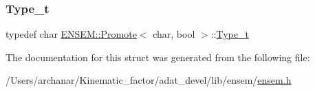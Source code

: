 \subsubsection{\texorpdfstring{Type\_t}{Type\_t}\hspace{0.1cm}{\footnotesize\ttfamily [2/2]}}
{\footnotesize\ttfamily typedef char \mbox{\hyperlink{structENSEM_1_1Promote}{E\+N\+S\+E\+M\+::\+Promote}}$<$ char, bool $>$\+::\mbox{\hyperlink{structENSEM_1_1Promote_3_01char_00_01bool_01_4_ad5b22f8f15e29245a56d9411fafedb3b}{Type\+\_\+t}}}



The documentation for this struct was generated from the following file\+:\begin{DoxyCompactItemize}
\item 
/\+Users/archanar/\+Kinematic\+\_\+factor/adat\+\_\+devel/lib/ensem/\mbox{\hyperlink{lib_2ensem_2ensem_8h}{ensem.\+h}}\end{DoxyCompactItemize}
